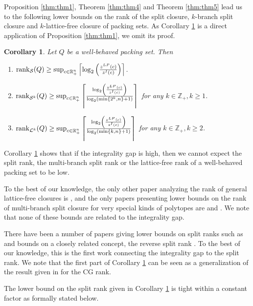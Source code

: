 \documentclass[11pt]{article}
\newcommand{\Z}{\mathbb{Z}}
\newcommand{\R}{\mathbb{R}}
\DeclareMathOperator{\rank}{rank}
\renewcommand{\S}{\mathcal{S}}
\renewcommand{\L}{\mathcal{L}}
\newtheorem{corollary}{Corollary}
\newcommand{\cred}{\color{black}}
\newcommand{\zLPc}{z^{LP}(c)}
\newcommand{\zIc}{z^{I}(c)}
\begin{document}
Proposition \ref{thm:thm1}, Theorem \ref{thm:thm4} and Theorem \ref{thm:thm5} lead us to the following lower bounds on the rank of {\cred the} split closure, $k$-branch split closure and $k$-lattice-free closure of packing sets. As Corollary \ref{cor:cor1} is a direct application of Proposition \ref{thm:thm1}, we omit its proof.

\begin{corollary}
\label{cor:cor1}
Let $Q$ be a well-behaved packing set. Then
\begin{enumerate}
\item $\rank_{\S}(Q) \geq {\cred \sup_{c \in \R_+^n}} \left\lceil \log_2 \left( \frac{\zLPc}{\zIc}\right)\right\rceil$.
\item $\rank_{\S^k}(Q) \geq {\cred \sup_{c \in \R_+^n}} \left\lceil\frac{\log_2 \left( \frac{\zLPc}{\zIc}\right)}{\log_2 (\min \{ 2^k,n \}+1)}\right\rceil$ for any $k \in \Z_+, k \geq 1$.
\item $\rank_{\L^k}(Q) \geq {\cred \sup_{c \in \R_+^n}} \left\lceil\frac{\log_2 \left( \frac{\zLPc}{\zIc}\right)}{\log_2 (\min \{ k,n \}+1)}\right\rceil$ for any $k \in \Z_+, k \geq 2$.
\end{enumerate}
\end{corollary}

Corollary \ref{cor:cor1} shows that if the integrality gap is high, then we cannot expect the split rank, the multi-branch split rank or the lattice-free rank of a well-behaved packing set to be low. 

To the best of our knowledge, the only other paper analyzing the rank of general lattice-free closures is \cite{averkov2017approximation}, and the only papers presenting lower bounds on the rank of multi-branch split closure for very special {\cred kinds} of polytopes are \cite{dash2013t} and \cite{li:ri:2008}. We note that none of these bounds are related to the {\cred integrality} gap.

There have been a number of papers giving lower bounds on split ranks such as \cite{BasuCM12, bodur2017cutting, cook:ka:sc:1990, dey:lowerbnd:2009, DeyL11} and bounds on a closely related concept, the {\cred reverse} split rank \cite{ConfortiPSFSpli15}. To the best of our knowledge, this is the first work connecting the integrality gap to the split rank. 
We note that the first part of Corollary \ref{cor:cor1} can be seen as a generalization of the result given in \cite{PokuttaS11} for the CG rank.

The lower bound on the split rank given in Corollary \ref{cor:cor1} is tight within a constant factor as formally stated below.
\end{document}
